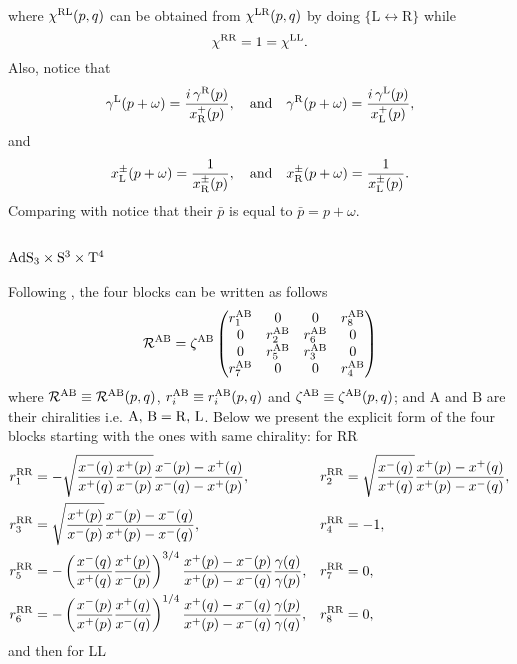 \documentclass[12pt,a4paper]{article}
\numberwithin{equation}{section}
\newcommand{\lR}{\mathcal{R}}
\newcommand{\tA}{\text{A}}
\newcommand{\tB}{\text{B}}
\newcommand{\tL}{\text{L}}
\newcommand{\tR}{\text{R}}
\begin{document}
where $ \chi^{{\rm RL}}(p,q) $ can be obtained from $ \chi^{{\rm LR}}(p,q) $ by doing $ \{\tL \leftrightarrow \tR\} $
while 
\begin{equation}
\chi^{{\rm RR}}=1=\chi^{{\rm LL}}.
\end{equation}
Also, notice that 
\begin{equation}
\gamma^{{\rm L}}(p+\omega)=\frac{i\, \gamma^{{\rm R}}(p)}{x^+_{{\rm R}}(p)}, \quad \text{and} \quad \gamma^{{\rm R}}(p+\omega)=\frac{i\, \gamma^{{\rm L}}(p)}{x^+_{{\rm L}}(p)},
\end{equation}
and
\begin{equation}
x^{\pm}_{{\rm L}}(p+\omega)=\frac{1}{x^{\pm}_{{\rm R}}(p)}, \quad \text{and} \quad x^{\pm}_{{\rm R}}(p+\omega)=\frac{1}{x^{\pm}_{{\rm L}}(p)}.
\end{equation}
Comparing with \cite{Borsato:2015mma} notice that their $ \bar{p} $ is equal to $ \bar{p}=p+\omega $.

\subsection{${\rm AdS}_{3}\times {\rm S}^3\times {\rm T}^4$} \label{AdS3background1}

Following \cite{Sfondrini:2014via,Borsato:2014exa}, the four blocks can be written as follows
\begin{equation}
\lR^{{\rm AB}}=\zeta^{{\rm AB}}\begin{pmatrix}
r_1^{{\rm AB}} &    0     &    0      & r_8^{{\rm AB}}\\
0    & r_2^{{\rm AB}} & r_6^{{\rm AB}}  &    0    \\
0    & r_5^{{\rm AB}} & r_3^{{\rm AB}}  &    0    \\
r_7^{{\rm AB}} &    0     &    0      & r_4^{{\rm AB}}
\end{pmatrix}
\label{RblocksT4}
\end{equation}
where $ \lR^{{\rm AB}}\equiv \lR^{{\rm AB}}(p,q) $, $ r_i^{{\rm AB}} \equiv r_i^{{\rm AB}}(p,q)$ and $\zeta^{{\rm AB}}\equiv \zeta^{{\rm AB}}(p,q) $; and $ \tA$ and $\tB $ are their chiralities i.e. ${\rm A},\,{\rm B}={\rm R},\,{\rm L}  $. Below we present the explicit form of the four blocks starting with the ones with same chirality: for RR
\begin{align}
& r_1^{{\rm RR}}=-\sqrt{\frac{x^-(q)}{x^+(q)}\frac{x^+(p)}{x^-(p)}} \frac{x^-(p)-x^+(q)}{x^-(q)-x^+(p)},
&& r_2^{{\rm RR}}=\sqrt{\frac{x^-(q)}{x^+(q)}}\frac{x^+(p)-x^+(q)}{x^+(p)-x^-(q)},\nonumber\\
& r_3^{{\rm RR}}=\sqrt{\frac{x^+(p)}{x^-(p)}}\frac{x^-(p)-x^-(q)}{x^+(p)-x^-(q)},
&& r_4^{{\rm RR}}=-1,\nonumber\\
& r_5^{{\rm RR}}=-\left(\frac{x^-(q)}{x^+(q)}\frac{x^+(p)}{x^-(p)}\right)^{3/4}\frac{x^+(p)-x^-(p)}{x^+(p)-x^-(q)}\frac{\gamma(q)}{\gamma(p)},
&& r_7^{{\rm RR}}=0,\nonumber\\
& r_6^{{\rm RR}}=-\left(\frac{x^-(p)}{x^+(p)}\frac{x^+(q)}{x^-(q)}\right)^{1/4}\frac{x^+(q)-x^-(q)}{x^+(p)-x^-(q)}\frac{\gamma(p)}{\gamma(q)}, && r_8^{{\rm RR}}=0,
\end{align}
and then for LL
\end{document}
